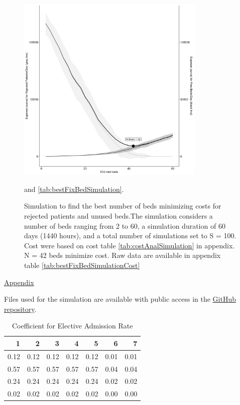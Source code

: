 \documentclass[12pt]{article}
\begin{document}
\begin{figure}[H]
\centering
\includegraphics[width=0.8\textwidth]{Image2.jpeg}
\caption{Simulation to find the best number of beds minimizing costs for rejected patients and unused beds.The simulation considers a number of beds ranging from 2 to 60, a simulation duration of 60 days (1440 hours), and a total number of simulations set to S = 100. Cost were based on cost table \ref{tab:costAnalSimulation} in appendix. N = 42 beds minimize cost. Raw data are available in appendix table \ref{tab:bestFixBedSimulationCost}} and \ref{tab:bestFixBedSimulation}.
\label{fig:fixBedNumberCostMinimization}
\end{figure}

\printbibliography

\newpage

\begin{center}
{\LARGE
\underline{Appendix}
}
\end{center}

Files used for the simulation are available with public access in the \href{https://github.com/querci-lorenzo/datathonESICM2023-team3}{GitHub repository}.\\


\begin{table}[H]
\captionsetup{skip=10pt}
\caption{Coefficient for Elective Admission Rate}
\label{tab:electiveCoefAdmRate}
\centering
\begin{tabular}{rrrrrrr}
\hline
1 & 2 & 3 & 4 & 5 & 6 & 7 \\ 
\hline
0.12 & 0.12 & 0.12 & 0.12 & 0.12 & 0.01 & 0.01 \\
0.57 & 0.57 & 0.57 & 0.57 & 0.57 & 0.04 & 0.04 \\
0.24 & 0.24 & 0.24 & 0.24 & 0.24 & 0.02 & 0.02 \\
0.02 & 0.02 & 0.02 & 0.02 & 0.02 & 0.00 & 0.00 \\
   \hline
\end{tabular}
\end{table}
\end{document}
